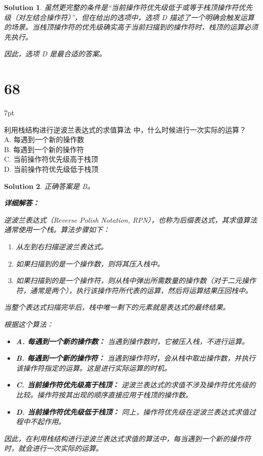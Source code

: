 \documentclass[UTF8]{report}
\newtheorem{solution}{Solution}
\theoremstyle{MyLineTheoremStyle} %
\theoremstyle{MyBlockTheoremStyle} %
\theoremstyle{MySubsubsectionStyle} %
\newenvironment{graybox}{%
        \def\FrameCommand{%
        \hspace{1pt}%
        {\color{gray}\small \vrule width 2pt}%
        {\color{graybox_color}\vrule width 4pt}%
        \colorbox{graybox_color}%
        }%
        \MakeFramed{\advance\hsize-\width\FrameRestore}%
        \noindent\hspace{-4.55pt}%
        \begin{adjustwidth}{}{7pt}%
        \vspace{2pt}\vspace{2pt}%
        }
        {%
        \vspace{2pt}\end{adjustwidth}\endMakeFramed%
        }
\begin{document}
\begin{solution}
虽然更完整的条件是“当前操作符优先级低于或等于栈顶操作符优先级（对左结合操作符）”，但在给出的选项中，选项 D 描述了一个明确会触发运算的场景。当栈顶操作符的优先级确实高于当前扫描到的操作符时，栈顶的运算必须先执行。

因此，选项 D 是最合适的答案。
\end{solution}

\section*{68}
\begin{graybox}
利用栈结构进行逆波兰表达式的求值算法
中，什么时候进行一次实际的运算？\\
A. 每遇到一个新的操作数 \\
B. 每遇到一个新的操作符 \\
C. 当前操作符优先级高于栈顶 \\
D. 当前操作符优先级低于栈顶
\end{graybox}

\begin{solution}
正确答案是 B。

\textbf{详细解答：}

逆波兰表达式（Reverse Polish Notation, RPN），也称为后缀表达式，其求值算法通常使用一个栈。算法步骤如下：
\begin{enumerate}
    \item 从左到右扫描逆波兰表达式。
    \item 如果扫描到的是一个操作数，则将其压入栈中。
    \item 如果扫描到的是一个操作符，则从栈中弹出所需数量的操作数（对于二元操作符，通常是两个），执行该操作符所代表的运算，然后将运算结果压回栈中。
\end{enumerate}
当整个表达式扫描完毕后，栈中唯一剩下的元素就是表达式的最终结果。

根据这个算法：
\begin{itemize}
    \item \textbf{A. 每遇到一个新的操作数：} 当遇到操作数时，它被压入栈，不进行运算。
    \item \textbf{B. 每遇到一个新的操作符：} 当遇到操作符时，会从栈中取出操作数，并执行该操作符指定的运算。这是进行实际运算的时机。
    \item \textbf{C. 当前操作符优先级高于栈顶：} 逆波兰表达式的求值不涉及操作符优先级的比较。操作符按其出现的顺序直接应用于栈顶的操作数。
    \item \textbf{D. 当前操作符优先级低于栈顶：} 同上，操作符优先级在逆波兰表达式求值过程中不起作用。
\end{itemize}

因此，在利用栈结构进行逆波兰表达式求值的算法中，每当遇到一个新的操作符时，就会进行一次实际的运算。
\end{solution}
\end{document}
